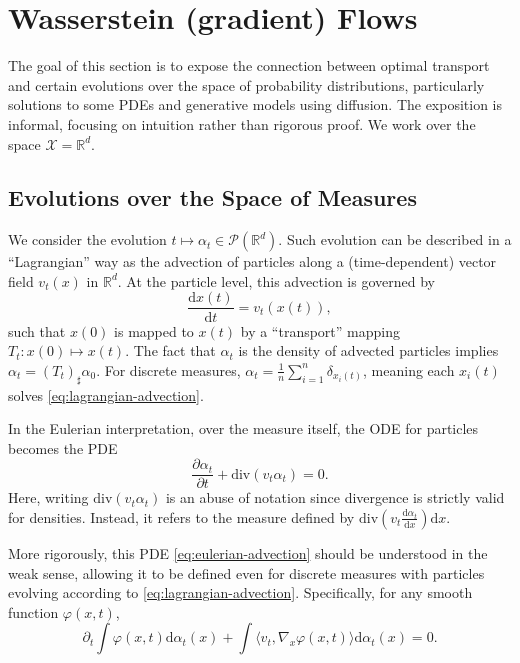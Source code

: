 \section{Wasserstein (gradient) Flows}

The goal of this section is to expose the connection between optimal transport and certain evolutions over the space of probability distributions, particularly solutions to some PDEs and generative models using diffusion. The exposition is informal, focusing on intuition rather than rigorous proof. We work over the space $\mathcal{X} = \mathbb{R}^d$.

\subsection{Evolutions over the Space of Measures}

We consider the evolution $t \mapsto \alpha_t \in \mathcal{P}(\mathbb{R}^d)$. Such evolution can be described in a ``Lagrangian'' way as the advection of particles along a (time-dependent) vector field $v_t(x)$ in $\mathbb{R}^d$. At the particle level, this advection is governed by 
\begin{equation}
    \frac{\mathrm{d}x(t)}{\mathrm{d}t} = v_t(x(t)), \label{eq:lagrangian-advection}
\end{equation}
such that $x(0)$ is mapped to $x(t)$ by a ``transport'' mapping $T_t : x(0) \mapsto x(t)$. The fact that $\alpha_t$ is the density of advected particles implies $\alpha_t = (T_t)_\sharp \alpha_0$. For discrete measures, $\alpha_t = \frac{1}{n} \sum_{i=1}^n \delta_{x_i(t)}$, meaning each $x_i(t)$ solves \eqref{eq:lagrangian-advection}.

In the Eulerian interpretation, over the measure itself, the ODE for particles becomes the PDE
\begin{equation}
    \frac{\partial \alpha_t}{\partial t} + \mathrm{div}(v_t \alpha_t) = 0. \label{eq:eulerian-advection}
\end{equation}
Here, writing $\mathrm{div}(v_t \alpha_t)$ is an abuse of notation since divergence is strictly valid for densities. Instead, it refers to the measure defined by $\mathrm{div}\left(v_t \frac{\mathrm{d} \alpha_t}{\mathrm{d} x}\right) \mathrm{d}x$.

More rigorously, this PDE \eqref{eq:eulerian-advection} should be understood in the weak sense, allowing it to be defined even for discrete measures with particles evolving according to \eqref{eq:lagrangian-advection}. Specifically, for any smooth function $\varphi(x, t)$,
\begin{equation}
    \partial_t \int \varphi(x, t) \mathrm{d} \alpha_t(x) 
    + \int \langle v_t, \nabla_x \varphi(x, t) \rangle \mathrm{d} \alpha_t(x) = 0.
\end{equation}


